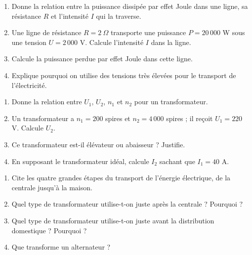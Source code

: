 \begin{enumerate}[label=\arabic*)]
\item Donne la relation entre la puissance dissipée par effet Joule dans une ligne, sa
résistance $R$ et l'intensité $I$ qui la traverse.
\item Une ligne de résistance $R=2\ \Omega$ transporte une puissance $P=20\,000$ W sous
une tension $U=2\,000$ V. Calcule l'intensité $I$ dans la ligne.
\item Calcule la puissance perdue par effet Joule dans cette ligne.
\item Explique pourquoi on utilise des tensions très élevées pour le transport de
l'électricité.
\end{enumerate}

\sujetbac[Transformateur]
\begin{enumerate}[label=\arabic*)]
\item Donne la relation entre $U_1$, $U_2$, $n_1$ et $n_2$ pour un transformateur.
\item Un transformateur a $n_1=200$ spires et $n_2=4\,000$ spires ; il reçoit
$U_1=220$ V. Calcule $U_2$.
\item Ce transformateur est-il élévateur ou abaisseur ? Justifie.
\item En supposant le transformateur idéal, calcule $I_2$ sachant que $I_1=40$ A.
\end{enumerate}

\begin{enumerate}[label=\arabic*)]
\item Cite les quatre grandes étapes du transport de l'énergie électrique, de la centrale
jusqu'à la maison.
\item Quel type de transformateur utilise-t-on juste après la centrale ? Pourquoi ?
\item Quel type de transformateur utilise-t-on juste avant la distribution domestique ?
Pourquoi ?
\item Que transforme un alternateur ?
\end{enumerate}

